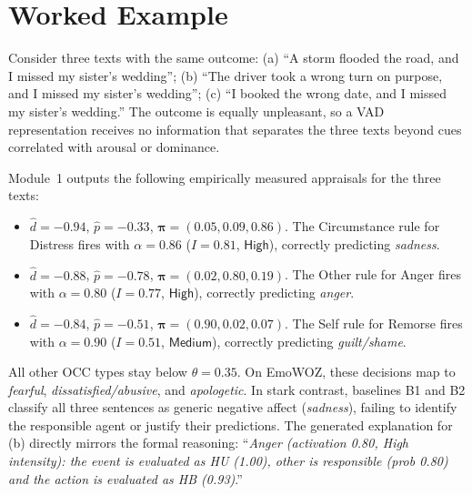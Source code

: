 \documentclass[conference, a4paper]{IEEEtran}
\newcommand{\term}[1]{\mathsf{#1}}
\begin{document}
\section{Worked Example}
\label{sec:case}
Consider three texts with the same outcome: (a) ``A storm flooded the road, and I missed my sister's wedding''; (b) ``The driver took a wrong turn on purpose, and I missed my sister's wedding''; (c) ``I booked the wrong date, and I missed my sister's wedding.'' The outcome is equally unpleasant, so a VAD representation receives no information that separates the three texts beyond cues correlated with arousal or dominance. 

Module~1 outputs the following empirically measured appraisals for the three texts:
\begin{itemize}
    \item[(a)] $\hat d = -0.94$, $\hat p = -0.33$, $\boldsymbol{\pi} = (0.05, 0.09, 0.86)$. The Circumstance rule for Distress fires with $\alpha = 0.86$ ($I = 0.81$, $\term{High}$), correctly predicting \textit{sadness}.
    \item[(b)] $\hat d = -0.88$, $\hat p = -0.78$, $\boldsymbol{\pi} = (0.02, 0.80, 0.19)$. The Other rule for Anger fires with $\alpha = 0.80$ ($I = 0.77$, $\term{High}$), correctly predicting \textit{anger}.
    \item[(c)] $\hat d = -0.84$, $\hat p = -0.51$, $\boldsymbol{\pi} = (0.90, 0.02, 0.07)$. The Self rule for Remorse fires with $\alpha = 0.90$ ($I = 0.51$, $\term{Medium}$), correctly predicting \textit{guilt/shame}.
\end{itemize}
All other OCC types stay below $\theta = 0.35$. On EmoWOZ, these decisions map to \textit{fearful}, \textit{dissatisfied/abusive}, and \textit{apologetic}. In stark contrast, baselines B1 and B2 classify all three sentences as generic negative affect (\textit{sadness}), failing to identify the responsible agent or justify their predictions. The generated explanation for (b) directly mirrors the formal reasoning: ``\textit{Anger (activation 0.80, High intensity): the event is evaluated as HU (1.00), other is responsible (prob 0.80) and the action is evaluated as HB (0.93)}.''
\end{document}
